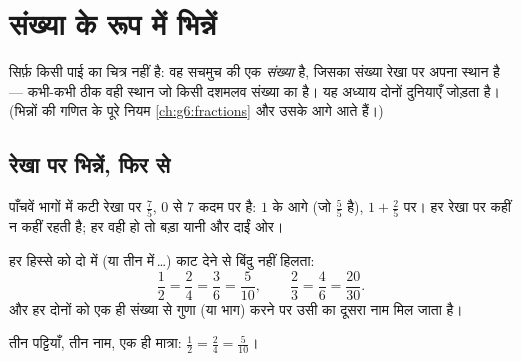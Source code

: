 \chapter{संख्या के रूप में भिन्नें}\label{ch:g5:fractions}

 सिर्फ़ किसी पाई का चित्र नहीं है: वह सचमुच की एक
\emph{संख्या} है, जिसका संख्या रेखा पर अपना स्थान है --- कभी-कभी
ठीक वही स्थान जो किसी दशमलव संख्या का है। यह अध्याय दोनों दुनियाएँ
जोड़ता है। (भिन्नों की गणित के पूरे नियम \cref{ch:g6:fractions}
और उसके आगे आते हैं।)

\section{रेखा पर भिन्नें, फिर से}

\begin{example}[रखना और पढ़ना]\label{ex:g5:fractions:place}
पाँचवें भागों में कटी रेखा पर $\frac{7}{5}$, $0$ से $7$ कदम पर
है: $1$ के आगे (जो $\frac55$ है), $1 + \frac25$ पर। हर 
रेखा पर कहीं न कहीं रहती है; हर वही हो तो बड़ा  यानी और दाईं ओर।
\end{example}

\begin{proposition}[एक ही बिंदु, कई नाम]\label{prop:g5:fractions:equal}
हर हिस्से को दो में (या तीन में\,\dots) काट देने से बिंदु नहीं
हिलता:
\[
\frac{1}{2} = \frac{2}{4} = \frac{3}{6} = \frac{5}{10},
\qquad
\frac{2}{3} = \frac{4}{6} = \frac{20}{30}.
\]
 और हर दोनों को एक ही संख्या से गुणा (या भाग) करने पर उसी
 का दूसरा नाम मिल जाता है।
\end{proposition}
\admitted

\begin{omfigure}

{\small तीन पट्टियाँ, तीन नाम, एक ही मात्रा: $\frac12 = \frac24 =
\frac{5}{10}$।}
\end{omfigure}

